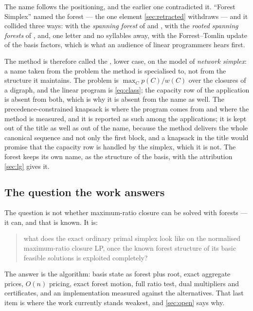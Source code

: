 The name follows the positioning, and the earlier one contradicted it. ``Forest
Simplex'' named the forest --- the one element \cref{sec:retracted} withdraws
--- and it collided three ways: with the \emph{spanning forest} of
\citet{MollakhaniEtAl2026} and \citet{Wuille2025}, with the \emph{rooted
spanning forests} of \citet{Yang2026}, and, one letter and no syllables away,
with the Forrest--Tomlin update of the basis factors, which is what an audience
of linear programmers hears first.

The method is therefore called the \FS{}, lower case, on the model of
\emph{network simplex}: a name taken from the problem the method is specialised
to, not from the structure it maintains. The problem is
\(\max_C p(C)/w(C)\) over the closures of a digraph, and the linear program is
\eqref{eq:class}; the capacity row of the application is absent from both,
which is why it is absent from the name as well. The precedence-constrained knapsack is where
the program comes from and where the method is measured, and it is reported as
such among the applications; it is kept out of the title as well as out of the
name, because the method delivers the whole canonical sequence and not only the
first block, and a knapsack in the title would promise that the capacity row is
handled by the simplex, which it is not.
The forest keeps its own name, as the structure of the basis, with the
attribution \cref{sec:lg} gives it.

\subsection{The question the work answers}

The question is not whether maximum-ratio closure can be solved with forests ---
it can, and that is known. It is:

\begin{quote}
what does the exact ordinary primal simplex look like on the normalised
maximum-ratio closure LP, once the known forest structure of its basic feasible
solutions is exploited completely?
\end{quote}

The answer is the algorithm: basis state as forest plus root, exact aggregate
prices, $O(n)$ pricing, exact forest motion, full ratio test, dual multipliers
and certificates, and an implementation measured against the alternatives. That
last item is where the work currently stands weakest, and \cref{sec:open} says
why.
